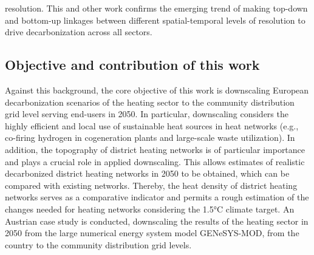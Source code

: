 resolution. This and other work confirms the emerging trend of making top-down and bottom-up linkages between different spatial-temporal levels of resolution to drive decarbonization across all sectors.\vspace{0.3cm}

\subsection{Objective and contribution of this work}
Against this background, the core objective of this work is downscaling European decarbonization scenarios of the heating sector to the community  distribution grid level serving end-users in 2050. In particular, downscaling considers the highly efficient and local use of sustainable heat sources in  heat networks (e.g., co-firing hydrogen in cogeneration plants and large-scale waste utilization). In addition, the topography of district heating networks is of particular importance and plays a crucial role in applied downscaling. This allows estimates of realistic  decarbonized district heating networks in 2050 to be obtained, which can be compared with existing networks. Thereby, the heat density of district heating networks serves as a comparative indicator and permits a rough estimation of the changes needed for  heating networks considering the 1.5°C climate target. An Austrian case study is conducted, downscaling the  results of the heating sector in 2050 from the large numerical energy system model GENeSYS-MOD, from the country to the community distribution grid levels.\vspace{0.3cm}

